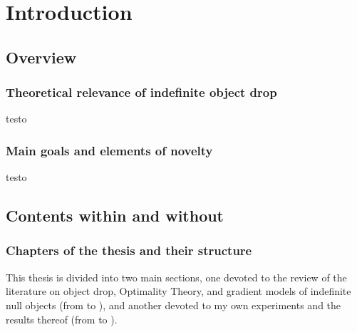 \setchapterpreamble[u]{\margintoc}
\chapter{Introduction}

\section{Overview} 

\subsection{Theoretical relevance of indefinite object drop}
testo 

\subsection{Main goals and elements of novelty}
testo



\section{Contents within and without} 

\subsection{Chapters of the thesis and their structure}
This thesis is divided into two main sections, one devoted to the review of the literature on object drop, Optimality Theory, and gradient models of indefinite null objects (from  to ), and another devoted to my own experiments and the results thereof (from  to ).

